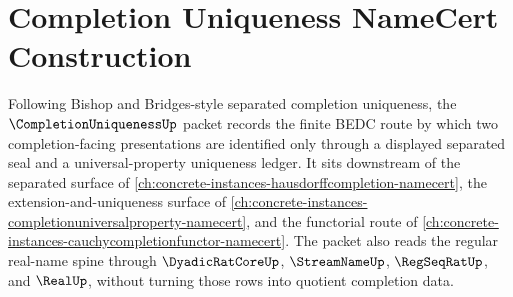 \chapter{Completion Uniqueness NameCert Construction}
\label{ch:concrete-instances-completion-uniqueness-namecert}

Following Bishop and Bridges-style separated completion uniqueness, the $\CompletionUniquenessUp$ packet records the finite BEDC route by which two completion-facing presentations are identified only through a displayed separated seal and a universal-property uniqueness ledger. It sits downstream of the separated surface of \autoref{ch:concrete-instances-hausdorffcompletion-namecert}, the extension-and-uniqueness surface of \autoref{ch:concrete-instances-completionuniversalproperty-namecert}, and the functorial route of \autoref{ch:concrete-instances-cauchycompletionfunctor-namecert}. The packet also reads the regular real-name spine through $\DyadicRatCoreUp$, $\StreamNameUp$, $\RegSeqRatUp$, and $\RealUp$, without turning those rows into quotient completion data.

